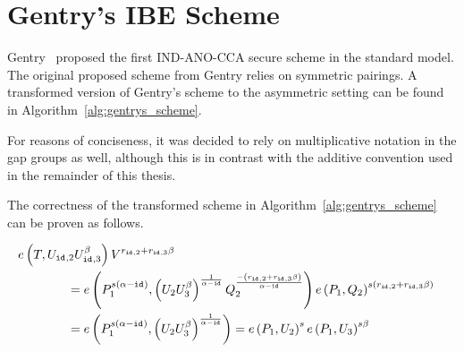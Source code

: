 \chapter{Gentry's IBE Scheme}
\label{app:gentrys_ibe_scheme}
Gentry~\cite{art:Gentry06} proposed the first IND-ANO-CCA secure scheme in the standard model. The original proposed scheme from Gentry relies on symmetric pairings. A transformed version of Gentry's scheme to the asymmetric setting can be found in Algorithm~\ref{alg:gentrys_scheme}.

For reasons of conciseness, it was decided to rely on multiplicative notation in the gap groups as well, although this is in contrast with the additive convention used in the remainder of this thesis.

The correctness of the transformed scheme in Algorithm~\ref{alg:gentrys_scheme} can be proven as follows.

\begin{equation*}
 \begin{split}
  e \left( T, U_{\id{},2} U_{\id{},3}^{\beta} \right) V^{ r_{\id{},2} + r_{\id{},3} \beta} \\
  & \negthickspace \negthickspace \negthickspace \negthickspace \negthickspace \negthickspace \negthickspace \negthickspace \negthickspace \negthickspace \negthickspace \negthickspace \negthickspace \negthickspace \negthickspace \negthickspace\negthickspace \negthickspace \negthickspace \negthickspace \negthickspace \negthickspace \negthickspace \negthickspace \negthickspace \negthickspace \negthickspace \negthickspace \negthickspace \negthickspace \negthickspace = e \left( P_1^{s\left( \alpha - \id{} \right)}, \left( U_{2}U_{3}^{\beta} \right)^{\frac{1}{\alpha - \id{}}} Q_2^{\frac{- \left( r_{\id{},2} + r_{\id{},3} \beta \right)}{\alpha - \id{}}} \right) e \left( P_1, Q_2 \right)^{s \left( r_{\id{},2} + r_{\id{},3} \beta \right)} \\
 & \negthickspace \negthickspace \negthickspace \negthickspace \negthickspace \negthickspace \negthickspace \negthickspace \negthickspace \negthickspace \negthickspace \negthickspace \negthickspace \negthickspace \negthickspace \negthickspace \negthickspace \negthickspace \negthickspace \negthickspace \negthickspace \negthickspace \negthickspace \negthickspace \negthickspace \negthickspace \negthickspace \negthickspace \negthickspace \negthickspace \negthickspace = e \left( P_1^{s\left( \alpha - \id{} \right)}, \left( U_{2}U_{3}^{\beta} \right)^{\frac{1}{\alpha - \id{}}} \right) = e \left( P_1, U_2 \right)^s e \left( P_1, U_3\right)^{s \beta}
 \end{split}
\end{equation*}


